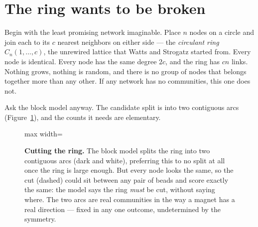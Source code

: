 \section{The ring wants to be broken}

Begin with the least promising network imaginable. Place $n$ nodes on a circle and
join each to its $c$ nearest neighbors on either side --- the \emph{circulant
ring} $C_n(1,\dots,c)$, the unrewired lattice that Watts and Strogatz started
from. Every node is identical. Every node has the same degree $2c$, and the ring
has $cn$ links. Nothing grows, nothing is random, and there is no group of nodes
that belongs together more than any other. If any network has no communities, this
one does not.

Ask the block model anyway. The candidate split is into two contiguous arcs
(Figure~\ref{fig:com-cutring}), and the counts it needs are elementary.

\begin{figure}[t]
\centering
\begin{adjustbox}{max width=\linewidth}\end{adjustbox}
\caption{\textbf{Cutting the ring.} The block model splits the ring into two
contiguous arcs (dark and white), preferring this to no split at all once the ring
is large enough. But every node looks the same, so the cut (dashed) could sit
between any pair of beads and score exactly the same: the model says the ring
\emph{must} be cut, without saying where. The two arcs are real communities in the
way a magnet has a real direction --- fixed in any one outcome, undetermined by the
symmetry.}
\label{fig:com-cutring}
\end{figure}

